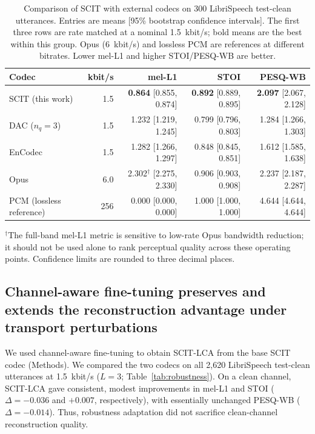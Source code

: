 \documentclass[final,5p,times,twocolumn]{elsarticle}
\begin{document}
\begin{table}[t]
\centering
\caption{Comparison of SCIT with external codecs on 300 LibriSpeech test-clean utterances. Entries are means [95\% bootstrap confidence intervals]. The first three rows are rate matched at a nominal 1.5~kbit/s; bold means are the best within this group. Opus (6~kbit/s) and lossless PCM are references at different bitrates. Lower mel-L1 and higher STOI/PESQ-WB are better.}
\label{tab:quality}
\small\setlength{\tabcolsep}{5pt}
\begin{tabular}{lrrrr}
\toprule
Codec & kbit/s & mel-L1 & STOI & PESQ-WB\\
\midrule
SCIT (this work) & 1.5 & \textbf{0.864} [0.855, 0.874] & \textbf{0.892} [0.889, 0.895] & \textbf{2.097} [2.067, 2.128]\\
DAC ($n_q=3$) & 1.5 & 1.232 [1.219, 1.245] & 0.799 [0.796, 0.803] & 1.284 [1.266, 1.303]\\
EnCodec & 1.5 & 1.282 [1.266, 1.297] & 0.848 [0.845, 0.851] & 1.612 [1.585, 1.638]\\
Opus & 6.0 & 2.302$^\dagger$ [2.275, 2.330] & 0.906 [0.903, 0.908] & 2.237 [2.187, 2.287]\\
PCM (lossless reference) & 256 & 0.000 [0.000, 0.000] & 1.000 [1.000, 1.000] & 4.644 [4.644, 4.644]\\
\bottomrule
\end{tabular}
\par\smallskip
\parbox{\textwidth}{\footnotesize $^\dagger$The full-band mel-L1 metric is sensitive to low-rate Opus bandwidth reduction; it should not be used alone to rank perceptual quality across these operating points. Confidence limits are rounded to three decimal places.}
\end{table}

\subsection{Channel-aware fine-tuning preserves and extends the reconstruction advantage under transport perturbations}
We used channel-aware fine-tuning to obtain SCIT-LCA from the base SCIT codec (Methods). We compared the two codecs on all 2,620 LibriSpeech test-clean utterances at 1.5~kbit/s ($L=3$; Table~\ref{tab:robustness}). On a clean channel, SCIT-LCA gave consistent, modest improvements in mel-L1 and STOI ($\Delta=-0.036$ and $+0.007$, respectively), with essentially unchanged PESQ-WB ($\Delta=-0.014$). Thus, robustness adaptation did not sacrifice clean-channel reconstruction quality.
\end{document}
